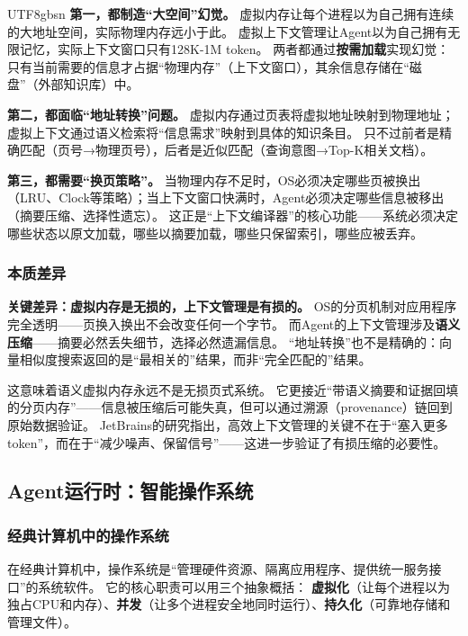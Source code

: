 \documentclass[11pt,a4paper]{article}
\begin{document}
\begin{CJK*}{UTF8}{gbsn}
\textbf{第一，都制造``大空间''幻觉。}
虚拟内存让每个进程以为自己拥有连续的大地址空间，实际物理内存远小于此。
虚拟上下文管理让Agent以为自己拥有无限记忆，实际上下文窗口只有128K-1M token。
两者都通过\textbf{按需加载}实现幻觉：只有当前需要的信息才占据``物理内存''（上下文窗口），其余信息存储在``磁盘''（外部知识库）中。

\textbf{第二，都面临``地址转换''问题。}
虚拟内存通过页表将虚拟地址映射到物理地址；虚拟上下文通过语义检索将``信息需求''映射到具体的知识条目。
只不过前者是精确匹配（页号→物理页号），后者是近似匹配（查询意图→Top-K相关文档）。

\textbf{第三，都需要``换页策略''。}
当物理内存不足时，OS必须决定哪些页被换出（LRU、Clock等策略）；当上下文窗口快满时，Agent必须决定哪些信息被移出（摘要压缩、选择性遗忘）。
这正是``上下文编译器''的核心功能——系统必须决定哪些状态以原文加载，哪些以摘要加载，哪些只保留索引，哪些应被丢弃\cite{contextcompiler2025}。

\subsubsection{本质差异}

\textbf{关键差异：虚拟内存是\textbf{无损}的，上下文管理是\textbf{有损}的。}
OS的分页机制对应用程序完全透明——页换入换出不会改变任何一个字节。
而Agent的上下文管理涉及\textbf{语义压缩}——摘要必然丢失细节，选择必然遗漏信息。
``地址转换''也不是精确的：向量相似度搜索返回的是``最相关的''结果，而非``完全匹配的''结果。

这意味着语义虚拟内存永远不是无损页式系统。
它更接近``带语义摘要和证据回填的分页内存''——信息被压缩后可能失真，但可以通过溯源（provenance）链回到原始数据验证。
JetBrains的研究指出，高效上下文管理的关键不在于``塞入更多token''，而在于``减少噪声、保留信号''\cite{jetbrains2025context}——这进一步验证了有损压缩的必要性。

\subsection{Agent运行时：智能操作系统}
\label{sec:agent}

\subsubsection{经典计算机中的操作系统}

在经典计算机中，操作系统是``管理硬件资源、隔离应用程序、提供统一服务接口''的系统软件\cite{ostep_2023}。
它的核心职责可以用三个抽象概括：
\textbf{虚拟化}（让每个进程以为独占CPU和内存）、\textbf{并发}（让多个进程安全地同时运行）、\textbf{持久化}（可靠地存储和管理文件）。


\end{CJK*}
\end{document}
